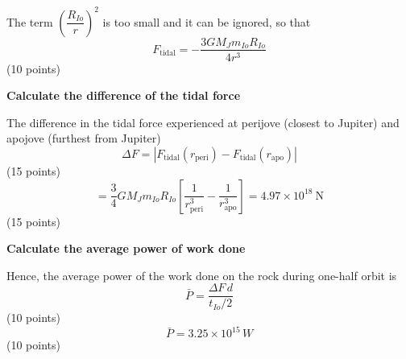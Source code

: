 The term $\left(\dfrac{R_{Io}}{r}\right)^2$ is too small and it can be
ignored, so that
\[
  F_{\mathrm{tidal}} = -\frac{3GM_J m_{Io} R_{Io}}{4r^3}
\]
\hfill(10 points)

\medskip
\textbf{Calculate the difference of the tidal force}

The difference in the tidal force experienced at perijove (closest to Jupiter)
and apojove (furthest from Jupiter)
\[
  \Delta F = \left|F_{\mathrm{tidal}}(r_{\mathrm{peri}})
    - F_{\mathrm{tidal}}(r_{\mathrm{apo}})\right|
\]
\hfill(15 points)
\[
  = \frac{3}{4}GM_J m_{Io} R_{Io}
    \left[\frac{1}{r_{\mathrm{peri}}^3} - \frac{1}{r_{\mathrm{apo}}^3}\right]
  = 4.97\times10^{18}\ \mathrm{N}
\]
\hfill(15 points)

\medskip
\textbf{Calculate the average power of work done}

Hence, the average power of the work done on the rock during one-half orbit
is
\[
  \bar P = \frac{\Delta F\,d}{t_{Io}/2}
\]
\hfill(10 points)
\[
  \bar P = 3.25\times10^{15}\,W
\]
\hfill(10 points)
